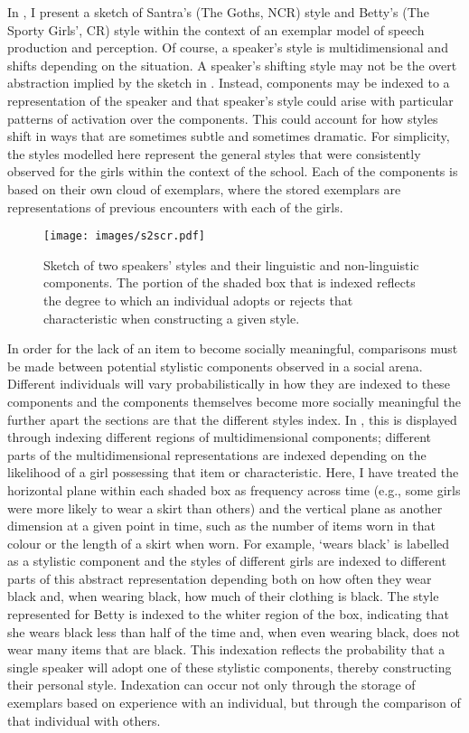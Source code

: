 In , I present a sketch of Santra's (The Goths, NCR) style and Betty's (The Sporty Girls', CR) style within the context of an exemplar model of speech production and perception.  Of course, a speaker's style is multidimensional and shifts depending on the situation.  A speaker's shifting style may not be the overt abstraction implied by the sketch in .  Instead, components may be indexed to a representation of the speaker and that speaker's style could arise with particular patterns of activation over the components.  This could account for how styles shift in ways that are sometimes subtle and sometimes dramatic.  For simplicity, the styles modelled here represent the general styles that were consistently observed for the girls within the context of the school.  Each of the components is based on their own cloud of exemplars, where the stored exemplars are representations of previous encounters with each of the girls.  

\begin{figure}
	\centering
		\texttt{[image: images/s2scr.pdf]} %
	\caption{Sketch of two speakers' styles and their linguistic and non-linguistic components.  The portion of the shaded box that is indexed reflects the degree to which an individual adopts or rejects that characteristic when constructing a given style.}
	\label{fig:SketchTwoStyles2}
\end{figure}



In order for the lack of an item to become socially meaningful, comparisons must be made between potential stylistic components observed in a social arena.  Different individuals will vary probabilistically in how they are indexed to these components and the components themselves become more socially meaningful the further apart the sections are that the different styles index.  In , this is displayed through indexing different regions of multidimensional components; different parts of the multidimensional representations are indexed depending on the likelihood of a girl possessing that item or characteristic.  Here, I have treated the horizontal plane within each shaded box as frequency across time (e.g., some girls were more likely to wear a skirt than others) and the vertical plane as another dimension at a given point in time, such as the number of items worn in that colour or the length of a skirt when worn.  For example, `wears black' is labelled as a stylistic component and the styles of different girls are indexed to different parts of this abstract representation depending both on how often they wear black and, when wearing black, how much of their clothing is black.  The style represented for Betty is indexed to the whiter region of the box, indicating that she wears black less than half of the time and, when even wearing black, does not wear many items that are black.  This indexation reflects the probability that a single speaker will adopt one of these stylistic components, thereby constructing their personal style.  Indexation can occur not only through the storage of exemplars based on experience with an individual, but through the comparison of that individual with others.  

